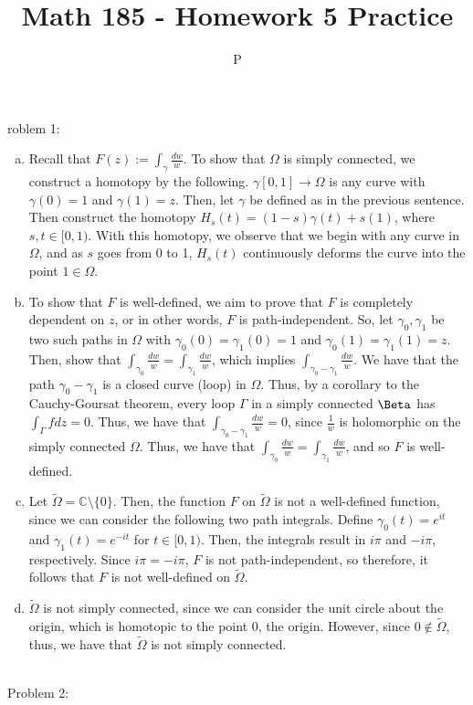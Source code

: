 \documentclass[12pt]{article}
\theoremstyle{definition}
\theoremstyle{named}
\begin{document}
\title{Math 185 - Homework 5 Practice}
\author{}
\date{}
\maketitle
\date

Problem 1: \\
\begin{enumerate}[(a)]
    \item Recall that $F(z) := \int_{\gamma} \frac{dw}{w}$. To show that $\Omega$ is simply connected, we construct a homotopy by the following. $\gamma[0,1] \to \Omega$ is any curve with $\gamma(0) = 1$ and $\gamma(1) = z$. Then, let $\gamma$ be defined as in the previous sentence. Then construct the homotopy $H_s(t) = (1-s)\gamma(t) + s(1)$, where $s,t \in [0,1)$. With this homotopy, we observe that we begin with any curve in $\Omega$, and as $s$ goes from 0 to 1, $H_s(t)$ continuously deforms the curve into the point $1 \in \Omega$. 
    \item To show that $F$ is well-defined, we aim to prove that $F$ is completely dependent on $z$, or in other words, $F$ is path-independent. So, let $\gamma_0, \gamma_1$ be two such paths in $\Omega$ with $\gamma_0(0) = \gamma_1(0) = 1$ and $\gamma_0(1)=\gamma_1(1) = z$. Then, show that $\int_{\gamma_0} \frac{dw}{w} = \int_{\gamma_1} \frac{dw}{w}$, which implies $\int_{\gamma_0 - \gamma_1} \frac{dw}{w}$. We have that the path $\gamma_0 - \gamma_1$ is a closed curve (loop) in $\Omega$. Thus, by a corollary to the Cauchy-Goursat theorem, every loop $\Gamma$ in a simply connected $\Beta$ has $\int_{\Gamma} f dz = 0$. Thus, we have that $\int_{\gamma_0 - \gamma_1} \frac{dw}{w} = 0$, since $\frac{1}{w}$ is holomorphic on the simply connected $\Omega$. Thus, we have that $\int_{\gamma_0} \frac{dw}{w} = \int_{\gamma_1} \frac{dw}{w}$, and so $F$ is well-defined. 
    \item Let $\tilde{\Omega} = \mathbb{C} \setminus \{0\}$. Then, the function $F$ on $\tilde{\Omega}$ is not a well-defined function, since we can consider the following two path integrals. Define $\gamma_0(t) = e^{it}$ and $\gamma_1(t) = e^{-it}$ for $t \in [0,1)$. Then, the integrals result in $i\pi$ and $-i\pi$, respectively. Since $i\pi = -i\pi$, $F$ is not path-independent, so therefore, it follows that $F$ is not well-defined on $\tilde{\Omega}$. 
    \item $\tilde{\Omega}$ is not simply connected, since we can consider the unit circle about the origin, which is homotopic to the point 0, the origin. However, since $0 \notin \tilde{\Omega}$, thus, we have that $\tilde{\Omega}$ is not simply connected. 
\end{enumerate}
\\

Problem 2: \\
\end{document}
